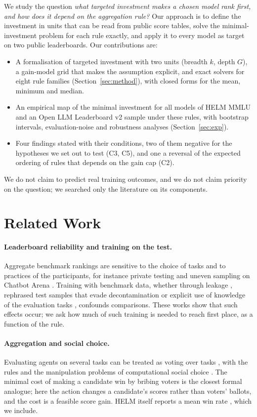 \documentclass{article}
\begin{document}
We study the question \emph{what targeted investment makes a chosen model rank first, and how does it depend on the aggregation rule?} Our approach is to define the investment in units that can be read from public score tables, solve the minimal-investment problem for each rule exactly, and apply it to every model as target on two public leaderboards. Our contributions are:
\begin{itemize}
\item A formalisation of targeted investment with two units (breadth $k$, depth $G$), a gain-model grid that makes the assumption explicit, and exact solvers for eight rule families (Section~\ref{sec:method}), with closed forms for the mean, minimum and median.
\item An empirical map of the minimal investment for all models of HELM MMLU and an Open LLM Leaderboard v2 sample under these rules, with bootstrap intervals, evaluation-noise and robustness analyses (Section~\ref{sec:exp}).
\item Four findings stated with their conditions, two of them negative for the hypotheses we set out to test (C3, C5), and one a reversal of the expected ordering of rules that depends on the gain cap (C2).
\end{itemize}
We do not claim to predict real training outcomes, and we do not claim priority on the question; we searched only the literature on its components.

\section{Related Work}
\paragraph{Leaderboard reliability and training on the test.} Aggregate benchmark rankings are sensitive to the choice of tasks \citep{dehghani2021lottery} and to practices of the participants, for instance private testing and uneven sampling on Chatbot Arena \citep{singh2025illusion}. Training with benchmark data, whether through leakage \citep{zhou2023cheater}, rephrased test samples that evade decontamination \citep{yang2023rephrased} or explicit use of knowledge of the evaluation tasks \citep{dominguez2024testtask}, confounds comparisons. These works show that such effects occur; we ask how much of such training is needed to reach first place, as a function of the rule.
\paragraph{Aggregation and social choice.} Evaluating agents on several tasks can be treated as voting over tasks \citep{lanctot2023socialchoice}, with the rules and the manipulation problems of computational social choice \citep{brandt2016handbook}. The minimal cost of making a candidate win by bribing voters \citep{faliszewski2009bribery} is the closest formal analogue; here the action changes a candidate's scores rather than voters' ballots, and the cost is a feasible score gain. HELM itself reports a mean win rate \citep{liang2022helm}, which we include.
\end{document}
